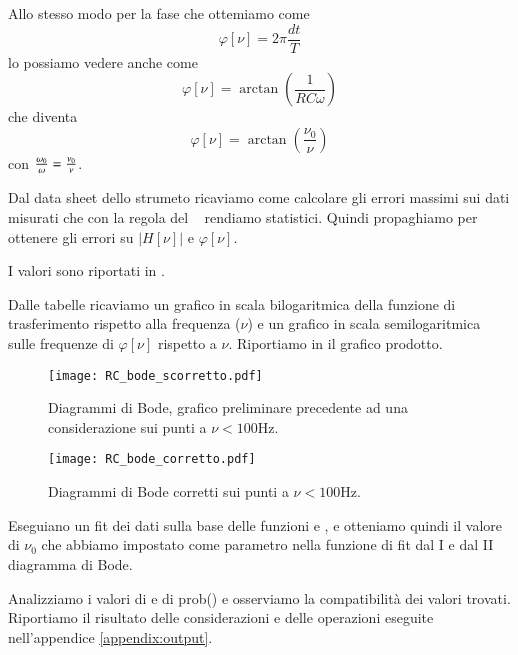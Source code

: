 \documentclass[
    rmp,
    reprint, 
    superscriptaddress, 
    altaffilletter, 
    amsmath, 
    amssymb, 
    a4paper]{revtex4-2}
\begin{document}
Allo stesso modo per la fase che ottemiamo come \[\varphi[\nu]=2\pi\frac{dt}{T}\] lo possiamo vedere anche come \[\varphi[\nu]=\arctan\left(\frac{1}{RC\omega}\right)\] che diventa \begin{equation} \varphi[\nu]=\arctan\left(\frac{\nu_0}{\nu}\right) \label{eqn:phi}\end{equation} con ${\omega_0\over\omega} = {\nu_0\over\nu}$.

Dal data sheet dello strumeto ricaviamo come calcolare gli errori massimi sui dati misurati che con la regola del \treSigma~ rendiamo statistici. Quindi propaghiamo per ottenere gli errori su $\left|H[\nu]\right|$ e $\varphi[\nu]$.

I valori sono riportati in .

Dalle tabelle ricaviamo un grafico in scala bilogaritmica della funzione di trasferimento rispetto alla frequenza ($\nu$) e un grafico in scala semilogaritmica sulle frequenze di $\varphi[\nu]$ rispetto a $\nu$. Riportiamo in  il grafico prodotto.

\begin{figure}
    \texttt{[image: RC\_bode\_scorretto.pdf]}
    \caption{Diagrammi di Bode, grafico preliminare precedente ad una considerazione sui punti a $\nu<100$Hz.}
    \label{fig:plot}
\end{figure}
\begin{figure}[t]
    \texttt{[image: RC\_bode\_corretto.pdf]}
    \caption{Diagrammi di Bode corretti sui punti a $\nu<100$Hz.}
    \label{fig:plot_correct}
\end{figure}

Eseguiano un fit dei dati sulla base delle funzioni  e , e otteniamo quindi il valore di $\nu_0$ che abbiamo impostato come parametro nella funzione di fit dal I e dal II diagramma di Bode.

Analizziamo i valori di \ChiNdf e di prob(\ChiSqr) e osserviamo la compatibilità dei valori trovati. Riportiamo il risultato delle considerazioni e delle operazioni eseguite nell'appendice \ref{appendix:output}.
\end{document}
